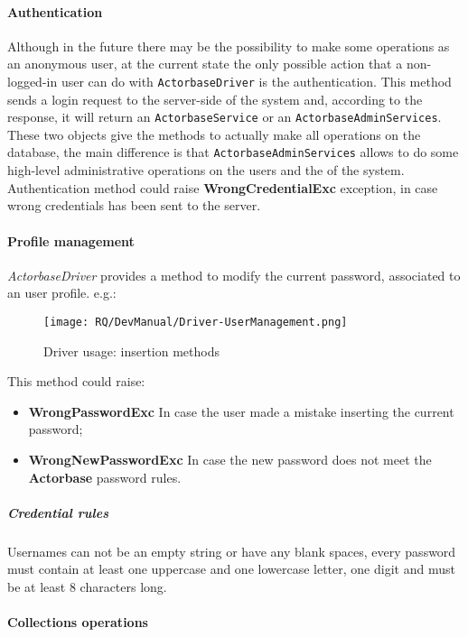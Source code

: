 \documentclass{scalatekids-article}
\begin{document}
\paragraph{Authentication}

Although in the future there may be the possibility to make some
operations as an anonymous user, at the current state the only possible action
that a non-logged-in user can do with \verb=ActorbaseDriver= is the authentication.
This method sends a login request to the server-side of the system and, according
to the response, it will return an \verb=ActorbaseService= or an
\verb=ActorbaseAdminServices=. These two objects give the methods to
actually make all operations on the database, the main difference is that
\verb=ActorbaseAdminServices= allows to do some high-level
administrative operations on the users and the  of the system.\\
Authentication method could raise \textbf{WrongCredentialExc} exception, in case
wrong credentials has been sent to the server.

\paragraph{Profile management}

\textit{ActorbaseDriver} provides a method to modify the current password,
associated to an user profile.
e.g.:
\begin{figure}[H]
  \begin{center}
    \texttt{[image: RQ/DevManual/Driver-UserManagement.png]}
    \caption{Driver usage: insertion methods}
  \end{center}
\end{figure}
This method could raise:
\begin{itemize}
\item \textbf{WrongPasswordExc} In case the user made a mistake inserting the current password;
\item \textbf{WrongNewPasswordExc} In case the new password does not meet the \textbf{Actorbase} password rules.
\end{itemize}

\subparagraph{Credential rules}
Usernames can not be an empty string or have any blank spaces, every password must
contain at least one uppercase and one lowercase letter, one digit and must be at
least 8 characters long.

\paragraph{Collections operations}
\end{document}
